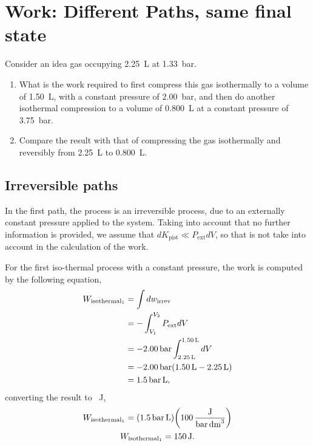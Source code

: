 \documentclass[main.tex]{subfiles}
\begin{document}
\section{Work: Different Paths, same final state}

Consider an idea gas occupying \SI{2.25}{\liter} at \SI{1.33}{\bar}.
\begin{enumerate}
    \item What is the work required to first compress this gas isothermally to a volume of \SI{1.50}{\liter}, with a constant pressure of \SI{2.00}{\bar}, and then do another isothermal compression to a volume of \SI{0.800}{\liter} at a constant pressure of \SI{3.75}{\bar}.
    \item Compare the result with that of compressing the gas isothermally and reversibly from \SI{2.25}{\liter} to \SI{0.800}{\liter}.
\end{enumerate}

\subsection{Irreversible paths}

In the first path, the process is an irreversible process, due to an externally constant pressure applied to the system.
Taking into account that no further information is provided, we assume that $dK_{\mathrm{pist}}\ll P_{\mathrm{ext}}dV$, so that is not take into account in the calculation of the work.

For the first iso-thermal process with a constant pressure, the work is computed by the following equation,
\begin{align*}
    W_{\mathrm{isothermal}_1} &= \int dw_{\mathrm{irrev}} \\
     &= -\int_{V_{1}}^{V_{2}} P_{\mathrm{ext}}dV \\
    &= -\SI{2.00}{\bar}\int_{\SI{2.25}{\liter}}^{\SI{1.50}{\liter}}dV \\
    &= -\SI{2.00}{\bar}\qty(\SI{1.50}{\liter}-\SI{2.25}{\liter}) \\
    &= \SI{1.5}{\bar\liter},
\end{align*}
converting the result to \SI{}{\joule},
\begin{gather*}
    W_{\mathrm{isothermal}_1} = \qty(\SI{1.5}{\bar\liter})\qty(\SI[per-mode=fraction]{100}{\joule\per\bar\per\deci\meter\tothe{3}}) \\
    W_{\mathrm{isothermal}_1} = \SI{150}{\joule}.
\end{gather*}
\end{document}
